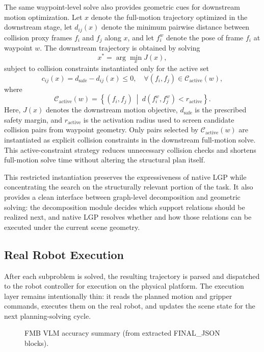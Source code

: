 \documentclass[journal]{IEEEtran}
\begin{document}
The same waypoint-level solve also provides geometric cues for downstream
motion optimization. Let $x$ denote the full-motion trajectory optimized in
the downstream stage, let $d_{ij}(x)$ denote the minimum pairwise distance
between collision proxy frames $f_i$ and $f_j$ along $x$, and let $f_i^w$ denote
the pose of frame $f_i$ at waypoint $w$. The downstream trajectory is obtained
by solving
\begin{equation}
x^* = \arg\min_x J(x),
\label{eq:active_objective}
\end{equation}
subject to collision constraints instantiated only for the active set
\begin{equation}
c_{ij}(x) = d_{\mathrm{safe}} - d_{ij}(x) \leq 0,
\quad \forall (f_i, f_j) \in \mathcal{C}_{\mathrm{active}}(w),
\label{eq:active_constraints}
\end{equation}
where
\begin{equation}
\mathcal{C}_{\mathrm{active}}(w) =
\left\{(f_i, f_j)\ \middle|\ d(f_i^w, f_j^w) < r_{\mathrm{active}}\right\}.
\label{eq:active_set}
\end{equation}
Here, $J(x)$ denotes the downstream motion objective, $d_{\mathrm{safe}}$ is
the prescribed safety margin, and $r_{\mathrm{active}}$ is the activation
radius used to screen candidate collision pairs from waypoint geometry.
Only pairs selected by $\mathcal{C}_{\mathrm{active}}(w)$ are instantiated
as explicit collision constraints in the downstream full-motion solve. This
active-constraint strategy reduces unnecessary collision checks and shortens
full-motion solve time without altering the structural plan itself.

This restricted instantiation preserves the expressiveness of native LGP while
concentrating the search on the structurally relevant portion of the task. It
also provides a clean interface between graph-level decomposition and
geometric solving: the decomposition module decides which support relations should be
realized next, and native LGP resolves whether and how those relations can be
executed under the current scene geometry.

\subsection{Real Robot Execution}
\label{subsec:phase4}

After each subproblem is solved, the resulting trajectory is parsed and
dispatched to the robot controller for execution on the physical platform.
The execution layer remains intentionally thin: it reads the planned motion
and gripper commands, executes them on the real robot, and updates the scene
state for the next planning-solving cycle.

\begin{figure}[!t]
\centering

\caption{FMB VLM accuracy summary (from extracted FINAL\_JSON blocks).}
\label{fig:fmb_accuracy}
\end{figure}







\end{document}
